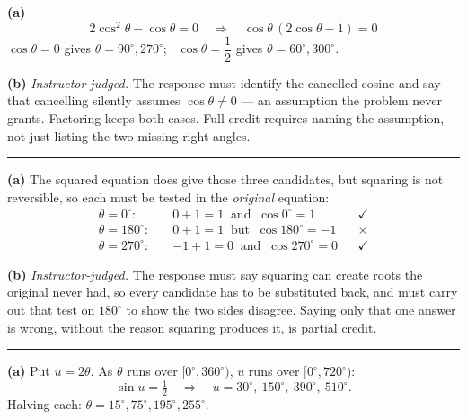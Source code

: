 \documentclass[12pt]{article}
\begin{document}
\textbf{(a)} \[ 2\cos^2\theta - \cos\theta = 0 \quad\Longrightarrow\quad \cos\theta\,(2\cos\theta - 1) = 0 \]
$\cos\theta = 0$ gives $\theta = 90^\circ, 270^\circ$; \ $\cos\theta = \dfrac{1}{2}$ gives $\theta = 60^\circ, 300^\circ$. 

\textbf{(b)} \emph{Instructor-judged.} The response must identify the cancelled cosine and say that cancelling silently assumes $\cos\theta \ne 0$ --- an assumption the problem never grants. Factoring keeps both cases. Full credit requires naming the assumption, not just listing the two missing right angles.

\vspace{0.12cm}\noindent\rule{\linewidth}{0.2pt}\vspace{0.12cm}


\textbf{(a)} The squared equation does give those three candidates, but squaring is not reversible, so each must be tested in the \emph{original} equation:
\begin{align*}
  \theta = 0^\circ:\quad & 0 + 1 = 1 \ \text{ and } \ \cos 0^\circ = 1 && \checkmark \\
  \theta = 180^\circ:\quad & 0 + 1 = 1 \ \text{ but } \ \cos 180^\circ = -1 && \times \\
  \theta = 270^\circ:\quad & -1 + 1 = 0 \ \text{ and } \ \cos 270^\circ = 0 && \checkmark
\end{align*}

\textbf{(b)} \emph{Instructor-judged.} The response must say squaring can create roots the original never had, so every candidate has to be substituted back, and must carry out that test on $180^\circ$ to show the two sides disagree. Saying only that one answer is wrong, without the reason squaring produces it, is partial credit.

\vspace{0.12cm}\noindent\rule{\linewidth}{0.2pt}\vspace{0.12cm}


\textbf{(a)} Put $u = 2\theta$. As $\theta$ runs over $[0^\circ, 360^\circ)$, $u$ runs over $[0^\circ, 720^\circ)$:
\[ \sin u = \tfrac{1}{2} \quad\Longrightarrow\quad u = 30^\circ,\ 150^\circ,\ 390^\circ,\ 510^\circ. \]
Halving each: $\theta = 15^\circ, 75^\circ, 195^\circ, 255^\circ$. 
\end{document}
